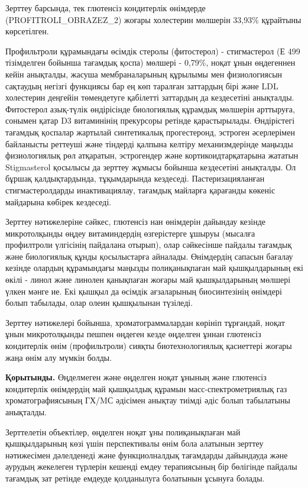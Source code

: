 \begin{multicols}{2}

Зерттеу барсында, тек глютенсіз кондитерлік өнімдерде
(PROFITROLI\_OBRAZEZ\_2) жоғары холестерин мөлшерін 33,93\% құрайтыны
көрсетілген.

Профильтроли құрамындағы өсімдік стеролы (фитостерол) - стигмастерол (Е
499 тізімделген бойынша тағамдық қоспа) мөлшері - 0,79\%, ноқат ұнын
өңдегеннен кейін анықталды, жасуша мембраналарының құрылымы мен
физиологиясын сақтаудың негізгі функциясы бар ең көп таралған заттардың
бірі және LDL холестерин деңгейін төмендетуге қабілетті заттардың да
кездесетіні анықталды. Фитостерол азық-түлік өндірісінде биологиялық
құрамдық мөлшерін арттыруға, сонымен қатар D3 витаминінің прекурсоры
ретінде қарастырылады. Өндірістегі тағамдық қоспалар жартылай
синтетикалық прогестеронд, эстроген әсерлерімен байланысты реттеуші және
тіндерді қалпына келтіру механизмдерінде маңызды физиологиялық рөл
атқаратын, эстрогендер және кортикоидтарқатарына жататын Stigmasterol
қосылысы да зерттеу жұмысы бойынша кездесетіні анықталды. Ол бұршақ
қалдықтардында, тұқымдарында кездеседі. Пастеризацияланған
стигмастеролдарды инактивациялау, тағамдық майларға қарағанды көкеніс
майдарына көбiрек кездеседі.

Зерттеу нәтижелеріне сәйкес, глютенсіз нан өнімдерін дайындау кезінде
микротолқынды өңдеу витаминдердің өзгерістерге ұшыруы (мысалға
профилтроли үлгісінің пайдалана отырып), олар сәйкесінше пайдалы
тағамдық және биологиялық құнды қосылыстарға айналады. Өнімдердің
сапасын бағалау кезінде олардың құрамындағы маңызды полиқанықпаған май
қышқылдарының екі өкілі - линол және линолен қанықпаған жоғары май
қышқылдарының мөлшері үлкен мәнге ие. Екі қышқыл да өсімдік ағзаларының
биосинтезінің өнімдері болып табылады, олар олеин қышқылынан түзіледі.

Зерттеу нәтижелері бойынша, хроматограммалардан көрініп тұрғандай, ноқат
ұнын микротолқынды пешпен өңдеген кезде өңделген ұннан глютенсіз
кондитерлік өнім (профильтроли) сияқты биотехнологиялық қасиеттері
жоғары жаңа өнім алу мүмкін болды.

{\bfseries Қорытынды.} Өңделмеген және өңделген ноқат ұнының және глютенсіз
кондитерлік өнімдердің май қышқылдық құрамын масс-спектрометриялық газ
хроматографиясының ГХ/MС әдісімен анықтау тиімді әдіс болып табылатыны
анықталды.

Зерттелетін объектілер, өңделген ноқат ұны полиқанықпаған май
қышқылдарының көзі үшін перспективалы өнім бола алатынын зерттеу
нәтижесімен дәлелденеді және функциолналдық тағамдарды дайындауда және
аурудың жекелеген түрлерін кешенді емдеу терапиясының бір бөлігінде
пайдалы тағамдық зат ретінде емдеуде қолданылуга болатынын ұсынуға
болады.


\end{multicols}
